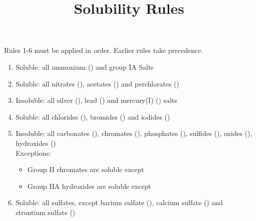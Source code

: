 \documentclass{article}
\title{Solubility Rules}
\date{}
\begin{document}
\maketitle
Rules 1-6 must be applied in order. Earlier rules take precedence.
\begin{enumerate}
	\item Soluble: all ammonium () and group IA Salts
	\item Soluble: all nitrates (), acetates () and perchlorates ()
	\item Insoluble: all silver (), lead () and mercury(I) () salts
	\item Soluble: all chlorides (), bromides () and iodides ()
	\item Insoluble: all carbonates (), chromates (), phosphates (), sulfides (), oxides (), hydroxides ()\\
		Exceptions:
		\begin{itemize}
			\item Group II chromates are soluble except 
			\item Group IIA hydroxides are soluble except 
		\end{itemize}
	\item Soluble: all sulfates, except barium sulfate (), calcium sulfate () and strontium sulfate ()
\end{enumerate}
\end{document}
